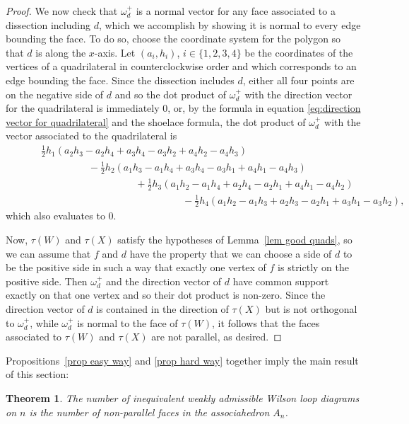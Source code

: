 \documentclass[11pt]{article}
\newtheorem{thm}{Theorem}[section]
\theoremstyle{remark}
\theoremstyle{definition}
\begin{document}
\begin{proof}
    We now check that $\omega^+_d$ is a normal vector for any face associated to a dissection including $d$, which we accomplish by showing it is normal to every edge bounding the face.  To do so, choose the coordinate system for the polygon so that $d$ is along the $x$-axis.  Let $(a_i, h_i)$, $i\in \{1,2,3,4\}$ be the coordinates of the vertices of a quadrilateral in counterclockwise order and which corresponds to an edge bounding the face.  Since the dissection includes $d$, either all four points are on the negative side of $d$ and so the dot product of $\omega^+_d$ with the direction vector for the quadrilateral is immediately $0$, or, by the formula in equation \eqref{eq:direction vector for quadrilateral} and the shoelace formula, the dot product of $\omega^+_d$ with the vector associated to the quadrilateral is
   \begin{align*}
       & \hspace{1cm}\textstyle\frac{1}{2}h_1(a_2h_3-a_2h_4+a_3h_4-a_3h_2+a_4h_2-a_4h_3) \\
       &\hspace{3cm} - \textstyle\frac{1}{2} h_2(a_1h_3-a_1h_4+a_3h_4-a_3h_1+a_4h_1-a_4h_3) \\
       &\hspace{5cm}+ \textstyle\frac{1}{2}h_3(a_1h_2-a_1h_4+a_2h_4-a_2h_1+a_4h_1-a_4h_2) \\
       &\hspace{7cm}- \textstyle\frac{1}{2}h_4(a_1h_2-a_1h_3+a_2h_3-a_2h_1+a_3h_1-a_3h_2), 
    \end{align*}
    which also evaluates to 0.

    Now, $\tau(W)$ and $\tau(X)$ satisfy the hypotheses of Lemma~\ref{lem good quads}, so we can assume that $f$ and $d$ have the property that we can choose a side of $d$ to be the positive side in such a way that exactly one vertex of $f$ is strictly on the positive side.  Then $\omega^+_d$ and the direction vector of $d$ have common support exactly on that one vertex and so their dot product is non-zero.  Since the direction vector of $d$ is contained in the direction of $\tau(X)$ but is not orthogonal to $\omega^+_d$, while $\omega^+_d$ is normal to the face of $\tau(W)$, it follows that the faces associated to $\tau(W)$ and $\tau(X)$ are not parallel, as desired.
\end{proof}


Propositions~\ref{prop easy way} and \ref{prop hard way} together imply the main result of this section:
\begin{thm}\label{thm:count inequiv diagrams}
  The number of inequivalent weakly admissible Wilson loop diagrams on $n$ is the number of non-parallel faces in the associahedron $A_n$.
\end{thm} 


\end{document}
